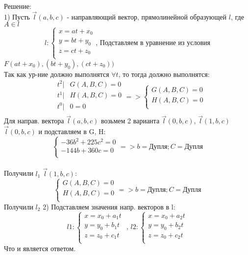 \documentclass[a4paper,14pt]{extreport} %
\begin{document}
Решение:\\
1) Пусть $\vec{l}(a,b,c)$ - направляющий вектор, прямолинейной образующей $ l $, где $ A \in l $
\[
  l: \begin{cases}
     x = at + x_0\\ 
     y = bt + y_0\\ 
     z = ct + z_0\\
   \end{cases} \text{, Подставляем в уравнение из условия}
\]
$F(at + x_0),(bt + y_0),( ct + z_0) )$
\[
\]
Так как ур-ние должно выполнятся $ \forall t $, то тогда должно выполнятся:
\[
\begin{aligned}
  &t^2|   &G(A,B,C) = 0\\
  &t^1|   &H(A,B,C) = 0\\
  &t^0|  &0 = 0\\
\end{aligned} =>
  \begin{cases}
G(A,B,C) = 0\\
H(A,B,C) = 0\\
  \end{cases}
\]  
Для направ. вектора $\vec{l}(a,b,c)$ возьмем 2 варианта $\vec{l}(0,b,c)$, $\vec{l}(1,b,c)$ \\
$\vec{l}(0,b,c)$ и подставляем в G, H: 
\[ 
  \begin{cases}
     -36b^2 + 225c^2 = 0\\
     - 144b + 360c = 0\\
   \end{cases} => b = \text{Дупля}; C = \text{Дупля} 
\]  
\\
Получили $l_1$
$\vec{l}(1,b,c)$: 
\[ 
  \begin{cases}
G(A,B,C) = 0\\
H(A,B,C) = 0\\
   \end{cases} => b = \text{Дупля}; C = \text{Дупля} 
\]  
Получили $l_2$
2) Подставляем значения напр. векторов в l: \\
\[
  l1:
  \begin{cases} 
     x = x_0 + a_1t\\ 
     y = y_0 + b_1t\\ 
     z = z_0 + c_1t\\ 
 \end{cases} \text{ , } l2:
\begin{cases} 
     x = x_0 + a_2t\\ 
     y = y_0 + b_2t\\ 
     z = z_0 + c_2t\\ 
\end{cases}
\]
Что и является ответом.\\
\end{document}
